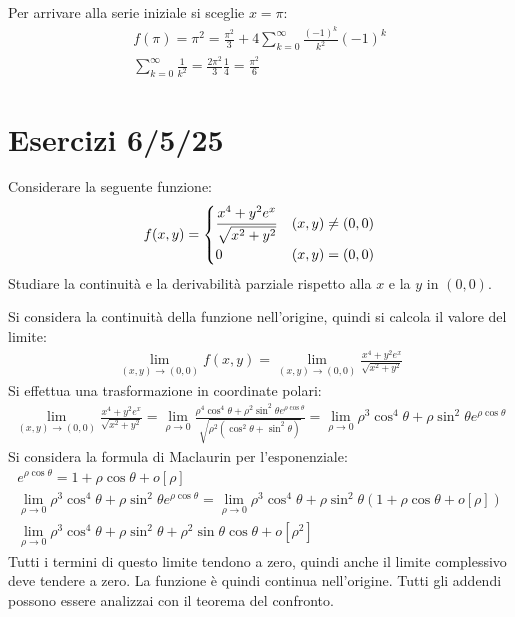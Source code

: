\documentclass{article}
\numberwithin{equation}{subsection}
\begin{document}
Per arrivare alla serie iniziale si sceglie $x=\pi$:
\begin{gather*}
    f(\pi)=\pi^2=\frac{\pi^2}{3}+4\sum_{k=0}^\infty\frac{(-1)^k}{k^2}(-1)^k\\
    \sum_{k=0}^\infty\frac{1}{k^2}=\frac{2\pi^2}{3}\frac{1}{4}=\frac{\pi^2}{6}
\end{gather*}

\section{Esercizi 6/5/25}

Considerare la seguente funzione:
\begin{gather*}
    f(x,y)=\begin{cases}
        \displaystyle\frac{\strut x^4+y^2e^x}{\strut\sqrt{x^2+y^2}}&(x,y)\neq(0,0)\\
        0&(x,y)=(0,0)
    \end{cases}
\end{gather*}
Studiare la continuità e la derivabilità parziale rispetto alla $x$ e la $y$ in $(0,0)$. 

Si considera la continuità della funzione nell'origine, quindi si calcola il valore del limite:
\begin{gather*}
    \lim_{(x,y)\to(0,0)}f(x,y)=\lim_{(x,y)\to(0,0)}\displaystyle\frac{x^4+y^2e^x}{\sqrt{x^2+y^2}}
\end{gather*}
Si effettua una trasformazione in coordinate polari:
\begin{gather*}
    \lim_{(x,y)\to(0,0)}\displaystyle\frac{x^4+y^2e^x}{\sqrt{x^2+y^2}}=
    \lim_{\rho\to0}\frac{\rho^4\cos^4\theta+\rho^2\sin^2\theta e^{\rho\cos\theta}}{\sqrt{\rho^2(\cos^2\theta+\sin^2\theta)}}=
    \lim_{\rho\to0}{\rho^3\cos^4\theta+\rho\sin^2\theta e^{\rho\cos\theta}}    
\end{gather*}
Si considera la formula di Maclaurin per l'esponenziale:
\begin{gather*}
    e^{\rho\cos\theta}=1+\rho\cos\theta+o[\rho]\\
    \lim_{\rho\to0}{\rho^3\cos^4\theta+\rho\sin^2\theta e^{\rho\cos\theta}}=
    \lim_{\rho\to0}{\rho^3\cos^4\theta+\rho\sin^2\theta (1+\rho\cos\theta+o[\rho])}\\
    \lim_{\rho\to0}\rho^3\cos^4\theta+\rho\sin^2\theta+\rho^2\sin\theta\cos\theta+o[\rho^2]    
\end{gather*}
Tutti i termini di questo limite tendono a zero, quindi anche il limite complessivo deve tendere a zero. La funzione è quindi continua nell'origine. Tutti gli addendi possono essere analizzai con il teorema del confronto. 
\end{document}
